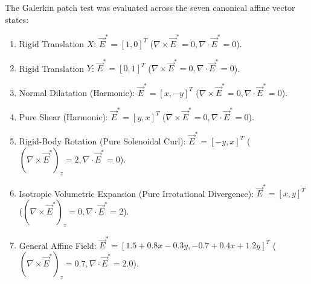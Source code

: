 \documentclass[preprint,12pt]{elsarticle}
\begin{document}
The Galerkin patch test was evaluated across the seven canonical affine vector states:
\begin{enumerate}
    \item Rigid Translation $X$: $\vec{E}^* = [1, 0]^T$ ($\nabla \times \vec{E}^* = 0, \nabla \cdot \vec{E}^* = 0$).
    \item Rigid Translation $Y$: $\vec{E}^* = [0, 1]^T$ ($\nabla \times \vec{E}^* = 0, \nabla \cdot \vec{E}^* = 0$).
    \item Normal Dilatation (Harmonic): $\vec{E}^* = [x, -y]^T$ ($\nabla \times \vec{E}^* = 0, \nabla \cdot \vec{E}^* = 0$).
    \item Pure Shear (Harmonic): $\vec{E}^* = [y, x]^T$ ($\nabla \times \vec{E}^* = 0, \nabla \cdot \vec{E}^* = 0$).
    \item Rigid-Body Rotation (Pure Solenoidal Curl): $\vec{E}^* = [-y, x]^T$ ($(\nabla \times \vec{E}^*)_z = 2, \nabla \cdot \vec{E}^* = 0$).
    \item Isotropic Volumetric Expansion (Pure Irrotational Divergence): $\vec{E}^* = [x, y]^T$ ($(\nabla \times \vec{E}^*)_z = 0, \nabla \cdot \vec{E}^* = 2$).
    \item General Affine Field: $\vec{E}^* = [1.5 + 0.8x - 0.3y, -0.7 + 0.4x + 1.2y]^T$ ($(\nabla \times \vec{E}^*)_z = 0.7, \nabla \cdot \vec{E}^* = 2.0$).
\end{enumerate}
\end{document}
